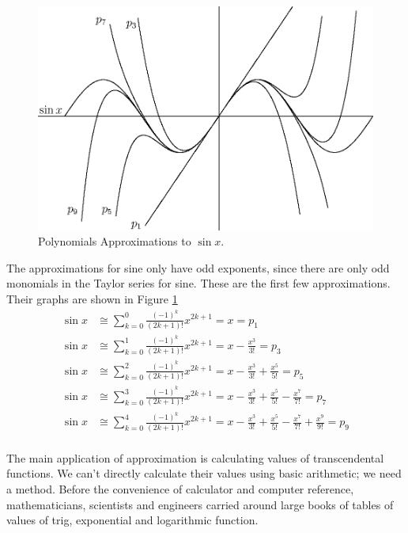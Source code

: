 \documentclass[fleqn,letterpaper]{report}
\begin{document}
\begin{figure}[t]
\centering
\includegraphics[width=12cm]{figure36.eps}
\caption{Polynomials Approximations to $\sin x$.}
\label{figure-sine-approximation}
\end{figure}

\begin{example}
The approximations for sine only have odd exponents, since there
are only odd monomials in the Taylor series for sine. These
are the first few approximations. Their graphs are shown in
Figure \ref{figure-sine-approximation}
\begin{align*}
\sin x & \cong \sum_{k=0}^0 \frac{(-1)^k}{(2k+1)!} x^{2k+1} =
x = p_1 \\
\sin x & \cong \sum_{k=0}^1 \frac{(-1)^k}{(2k+1)!} x^{2k+1} =
x - \frac{x^3}{3!} = p_3 \\
\sin x & \cong \sum_{k=0}^2 \frac{(-1)^k}{(2k+1)!} x^{2k+1} =
x - \frac{x^3}{3!} + \frac{x^5}{5!} = p_5 \\
\sin x & \cong \sum_{k=0}^3 \frac{(-1)^k}{(2k+1)!} x^{2k+1} =
x - \frac{x^3}{3!} + \frac{x^5}{5!} - \frac{x^7}{7!} = p_7 \\
\sin x & \cong \sum_{k=0}^4 \frac{(-1)^k}{(2k+1)!} x^{2k+1} =
x - \frac{x^3}{3!} + \frac{x^5}{5!} - \frac{x^7}{7!} +
\frac{x^9}{9!} = p_9 \\
\end{align*}
\end{example}

The main application of approximation is calculating values
of transcendental functions. We can't directly calculate their
values using basic arithmetic; we need a method. Before the
convenience of calculator and computer reference,
mathematicians, scientists and engineers carried around large
books of tables of values of trig, exponential and
logarithmic function. 
\end{document}
